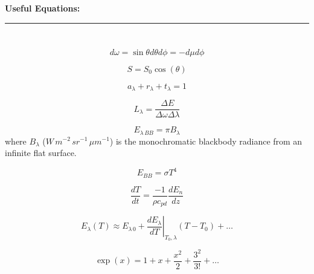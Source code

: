 \documentclass[12pt]{article}
\begin{document}
\begin{center}
  \textbf{Useful Equations:}
\end{center}



\begin{multicols}{2}


\noindent
\rule{3cm}{.1mm}

$~$

\noindent

$~$




\begin{equation}
  \label{eq:omega}
  d \omega = \sin \theta d\theta d\phi = -d\mu d\phi
\end{equation}

\begin{equation}
  \label{eq:cos}
  S = S_0 \cos(\theta)
\end{equation}

\begin{equation}
  \label{eq:conservation}
  a_\lambda + r_\lambda + t_\lambda = 1
\end{equation}

\begin{equation}
  \label{eq:intensity}
  L_\lambda = \frac{\Delta E}{\Delta \omega \Delta \lambda}
\end{equation}


\begin{equation}
  \label{eq:pi}
  E_{\lambda\,BB} = \pi B_\lambda
\end{equation}
where $B_\lambda$ ($W\,m^{-2}\,sr^{-1}\,\mu m^{-1}$) is the monochromatic blackbody radiance
from an infinite flat surface.


\begin{equation}
  \label{eq:stefan}
  E_{BB}=\sigma T^4
\end{equation}

\begin{equation}
  \label{eq:fluxdiv}
  \frac{dT}{dt} = \frac{-1}{\rho c_{pd}} \frac{dE_n}{dz}
\end{equation}


\begin{equation}
  \label{eq:taylor}
  E_\lambda(T) \approx E_{\lambda\, 0} + \left .\frac{dE_\lambda}{dT}  \right |_{T_0,\lambda} \!\!\! (T - T_0) + \ldots
\end{equation}

\begin{equation}
  \label{eq:exp}
  \exp(x) = 1 + x +  \frac{x^2}{2} + \frac{3^2}{3!} + \ldots
\end{equation}


\end{multicols}
\end{document}
